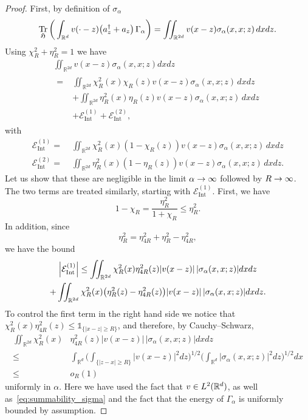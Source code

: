 \documentclass[10pt]{amsart}
\theoremstyle{definition}\newtheorem{defi}[theo]{Definition}\newtheorem{rema}[theo]{Remark}\newtheorem{exam}[theo]{Example}\newtheorem{exem}[theo]{Example}\newtheorem{nota}[theo]{Notation}
\DeclareMathOperator{\Tr}{Tr}
\DeclareMathOperator{\Intt}{Int}
\newcommand{\R}{\mathbb{R}}
\newcommand{\gH}{\mathfrak{H}}
\newcommand{\cE}{\mathcal{E}}
\newcommand{\1}{\mathds{1}}
\let\oldin\in
\renewcommand{\in}{\mathchoice{\oldin}{\oldin}{\,\oldin\,}{\,\oldin\,}}
\renewcommand*{\to}{\mathchoice{\longrightarrow}{\rightarrow}{\rightarrow}{\rightarrow}}
\let\originalleft\left
\let\originalright\right
\renewcommand{\left}{\mathopen{}\mathclose\bgroup\originalleft}
\renewcommand{\right}{\aftergroup\egroup\originalright}
\begin{document}
\begin{proof}
First, by definition of $\sigma_\alpha$
\begin{equation*}
\Tr_{ \gH}\bigg(\int_{\R^d}v(\cdot-z) \left(a^\dagger_z + a_z\right) \,\Gamma_\alpha\bigg)=\iint_{\R^{2d}}v(x-z) \sigma_\alpha(x,x;z)\, dxdz.
\end{equation*}
Using $\chi_R^2+\eta_R^2=1$ we have
\begin{multline}
\iint_{\R^{2d}}v(x-z)\sigma_{\alpha}(x,x;z)dxdz\\
\begin{aligned}
=\;& \iint_{\R^{2d}} \chi_R^2(x) \chi_R(z) v(x-z)\sigma_{\alpha}(x,x;z)\,dxdz\\
&+\iint_{\R^{2d}} \eta_R^2(x)\eta_R(z) v(x-z) \sigma_\alpha(x,x;z)\, dxdz\\
&+\cE_{\Intt}^{(1)}+\cE_{\Intt}^{(2)},
\end{aligned}
\end{multline}
with
\begin{equation}
\begin{split}
\cE_{\Intt}^{(1)} =\;&\iint_{\R^{2d}} \chi_R^2(x) (1-\chi_R(z))v(x-z)\sigma_{\alpha}(x,x;z)\,dxdz\\
\cE_{\Intt}^{(2)} =\;& \iint_{\R^{2d}}\eta_R^2(x) (1-\eta_R(z))v(x-z)\sigma_{\alpha}(x,x;z)\,dxdz.
\end{split}
\end{equation}
Let us show that these are negligible in the limit $\alpha\to\infty$ followed by $R\to\infty$. The two terms are treated similarly, starting with $\cE_{\Intt}^{(1)}$. First, we have
\begin{equation*}
1-\chi_R= \frac{\eta_R^2}{1+\chi_R} \le \eta_R^2.
\end{equation*}
In addition, since
\begin{equation*}
\eta_R^2=\eta_{4R}^2+ \eta_R^2-\eta_{4R}^2,
\end{equation*}
we have the bound
\begin{multline}\label{eq:partial_decomp_E^1_int}
\left|\cE_{\Intt}^{(1)}\right|\le\iint_{\R^{2d}} \chi_R^2(x) \eta_{4R}^2(z)|v(x-z)|\,|\sigma_{\alpha}(x,x;z)|dxdz\\
+\iint_{\R^{2d}} \chi_R^2(x)\left(\eta_R^2(z)- \eta_{4R}^2(z)\right)|v(x-z)|\,|\sigma_{\alpha}(x,x;z)|dxdz.
\end{multline}
To control the first term in the right hand side we notice that $\chi_R^2(x) \eta_{4R}^2(z) \le \1_{\{|x-z|\ge R\}}$, and therefore, by Cauchy--Schwarz,
\begin{equation*}
\begin{split}
\iint_{\R^{2d}} \chi_R^2(x)& \eta_{4R}^2(z)|v(x-z)|\,|\sigma_{\alpha}(x,x;z)|dxdz \\
\le\;& \int_{\R^d} \bigg(\int_{\{|z-x|\ge R\}}|v(x-z)|^2dz \bigg)^{1/2} \bigg(\int_{\R^d}|\sigma_\alpha(x,x;z)|^2dz \bigg)^{1/2}dx\\
\le\;& o_R(1)
\end{split}
\end{equation*}
uniformly in $\alpha$. Here we have used the fact that $v\in L^2(\R^d)$, as well as~\eqref{eq:summability_sigma} and the fact that the energy of $\Gamma_\alpha$ is uniformly bounded by assumption.


\end{proof}
\end{document}
